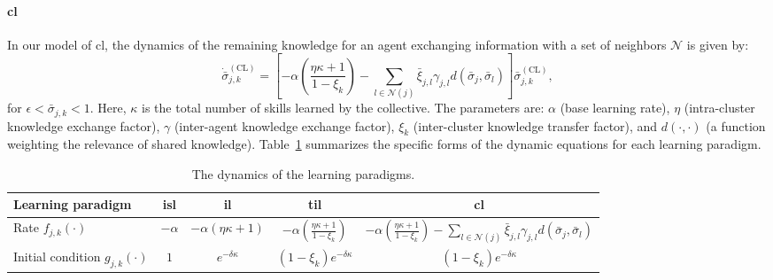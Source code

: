 \documentclass[12pt]{article}
\begin{document}
\paragraph*{\textbf{\Acl{cl}}}
In our model of \ac{cl}, the dynamics of the remaining knowledge for an agent exchanging information with a set of neighbors $\mathcal{N}$ is given by:
\begin{equation}\label{eq:collective_knowledge_dynamics_revised}
	\dot{\bar{\sigma}}^{(\text{CL})}_{j,k} =
		\left[-\alpha \left( \frac{\eta \kappa + 1}{1 - \xi_k} \right)  - \sum\limits_{l \in \mathcal{N}(j)} \bar{\xi}_{j,l} \gamma_{j,l} d(\bar{\sigma}_j,\bar{\sigma}_l)\right] \bar{\sigma}^{(\text{CL})}_{j,k},
\end{equation}
for $\epsilon < \bar{\sigma}_{j,k} < 1$. Here, $\kappa$ is the total number of skills learned by the collective. The parameters are: $\alpha$ (base learning rate), $\eta$ (intra-cluster knowledge exchange factor), $\gamma$ (inter-agent knowledge exchange factor), $\xi_k$ (inter-cluster knowledge transfer factor), and $d(\cdot,\cdot)$ (a function weighting the relevance of shared knowledge). Table~\ref{tab:learning_paradigms_expressions_revised} summarizes the specific forms of the dynamic equations for each learning paradigm.

\begin{table}[!t]
	\caption{The dynamics of the learning paradigms.\label{tab:learning_paradigms_expressions_revised}}
	\centering
	\begin{adjustbox}{width=\textwidth}
		\begin{tabular}{|l||c|c|c|c|}
			\hline
			\textbf{Learning paradigm} & \textbf{\ac{isl}} & \textbf{\ac{il}} & \textbf{\ac{til}} & \textbf{\ac{cl}} \\
			\hline\hline
			Rate $f_{j,k}\left(\cdot \right)$  & $-\alpha$ & $-\alpha\left(\eta \kappa + 1 \right)$ & $-\alpha \left( \frac{\eta \kappa + 1}{1 - \xi_k} \right)$ & $  -\alpha \left( \frac{\eta \kappa + 1}{1 - \xi_k} \right)  - \sum_{l \in \mathcal{N}(j)}\bar{\xi}_{j,l}\gamma_{j,l}d(\bar{\sigma}_j,\bar{\sigma}_l)$ \\
			\hline
			Initial condition $g_{j,k}\left(\cdot \right)$ & $1$ & $e^{-\delta \kappa}$ & $(1-\xi_k) e^{-\delta \kappa}$ & $(1-\xi_k) e^{-\delta \kappa} $ \\
			\hline
		\end{tabular}
	\end{adjustbox}
\end{table}

\end{document}
